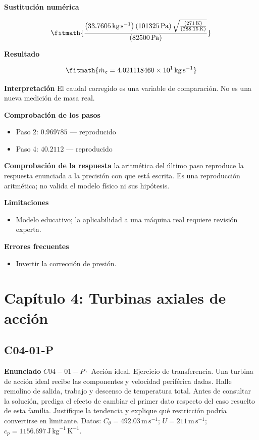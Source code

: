 \documentclass[10pt,openany]{book}
\begin{document}


\noindent\textbf{Sustitución numérica}

\[
\fitmath{\frac{\left(33.7605\,\mathrm{kg}\,\mathrm{s}^{-1}\right) \left(101325\,\mathrm{Pa}\right) \sqrt{\frac{\left(271\,\mathrm{K}\right)}{\left(288.15\,\mathrm{K}\right)}}}{\left(82500\,\mathrm{Pa}\right)}}
\]

\noindent\textbf{Resultado}

\[
\fitmath{\dot{m}_c=4.021118460\times10^{1}\,\mathrm{kg}\,\mathrm{s}^{-1}}
\]

\noindent\textbf{Interpretación}
El caudal corregido es una variable de comparación. No es una nueva medición de masa real.

\noindent\textbf{Comprobación de los pasos}
\begin{itemize}
\item Paso 2: $0.969785$ — reproducido
\item Paso 4: $40.2112$ — reproducido
\end{itemize}

\noindent\textbf{Comprobación de la respuesta} la aritmética del último paso reproduce la respuesta enunciada a la precisión con que está escrita. Es una reproducción aritmética; no valida el modelo físico ni sus hipótesis.

\noindent\textbf{Limitaciones}
\begin{itemize}
\item Modelo educativo; la aplicabilidad a una máquina real requiere revisión experta.
\end{itemize}

\noindent\textbf{Errores frecuentes}
\begin{itemize}
\item Invertir la corrección de presión.
\end{itemize}
\section{Capítulo 4: Turbinas axiales de acción}
\subsection*{C04-01-P}

\noindent\textbf{Enunciado}
\(C04-01-P \cdot\) Acción ideal. Ejercicio de transferencia. Una turbina de acción ideal recibe las componentes y velocidad periférica dadas. Halle remolino de salida, trabajo y descenso de temperatura total. Antes de consultar la solución, prediga el efecto de cambiar el primer dato respecto del caso resuelto de esta familia. Justifique la tendencia y explique qué restricción podría convertirse en limitante. Datos: \(C_\theta=492.03\, \mathrm{m}\,\mathrm{s}^{-1}\); \(U=211\, \mathrm{m}\,\mathrm{s}^{-1}\); \(c_p=1156.697\, \mathrm{J}\,\mathrm{kg}^{-1}\,\mathrm{K}^{-1}\).
\end{document}
